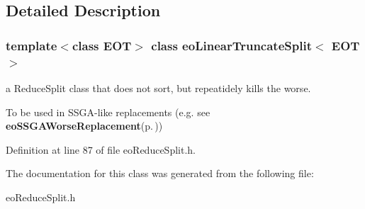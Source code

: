 \subsection{Detailed Description}
\subsubsection*{template$<$class EOT$>$ class eo\-Linear\-Truncate\-Split$<$ EOT $>$}

a Reduce\-Split class that does not sort, but repeatidely kills the worse. 

To be used in SSGA-like replacements (e.g. see {\bf eo\-SSGAWorse\-Replacement}{\rm (p.\,\pageref{classeo_s_s_g_a_worse_replacement})}) 



Definition at line 87 of file eo\-Reduce\-Split.h.

The documentation for this class was generated from the following file:\begin{CompactItemize}
\item 
eo\-Reduce\-Split.h\end{CompactItemize}
